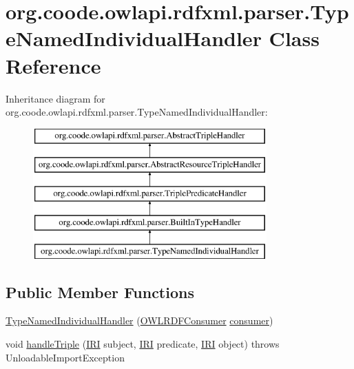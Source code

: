 \hypertarget{classorg_1_1coode_1_1owlapi_1_1rdfxml_1_1parser_1_1_type_named_individual_handler}{\section{org.\-coode.\-owlapi.\-rdfxml.\-parser.\-Type\-Named\-Individual\-Handler Class Reference}
\label{classorg_1_1coode_1_1owlapi_1_1rdfxml_1_1parser_1_1_type_named_individual_handler}
}
Inheritance diagram for org.\-coode.\-owlapi.\-rdfxml.\-parser.\-Type\-Named\-Individual\-Handler\-:\begin{figure}[H]
\begin{center}
\leavevmode
\includegraphics[height=5.000000cm]{classorg_1_1coode_1_1owlapi_1_1rdfxml_1_1parser_1_1_type_named_individual_handler}
\end{center}
\end{figure}
\subsection*{Public Member Functions}
\begin{DoxyCompactItemize}
\item 
\hyperlink{classorg_1_1coode_1_1owlapi_1_1rdfxml_1_1parser_1_1_type_named_individual_handler_af120a7cf8e2a012c6976d8f0dceeca6f}{Type\-Named\-Individual\-Handler} (\hyperlink{classorg_1_1coode_1_1owlapi_1_1rdfxml_1_1parser_1_1_o_w_l_r_d_f_consumer}{O\-W\-L\-R\-D\-F\-Consumer} \hyperlink{classorg_1_1coode_1_1owlapi_1_1rdfxml_1_1parser_1_1_abstract_triple_handler_a4ccf4d898ff01eb1cadfa04b23d54e9c}{consumer})
\item 
void \hyperlink{classorg_1_1coode_1_1owlapi_1_1rdfxml_1_1parser_1_1_type_named_individual_handler_adbf2a70c1861a3ad8108353be41944c9}{handle\-Triple} (\hyperlink{classorg_1_1semanticweb_1_1owlapi_1_1model_1_1_i_r_i}{I\-R\-I} subject, \hyperlink{classorg_1_1semanticweb_1_1owlapi_1_1model_1_1_i_r_i}{I\-R\-I} predicate, \hyperlink{classorg_1_1semanticweb_1_1owlapi_1_1model_1_1_i_r_i}{I\-R\-I} object)  throws Unloadable\-Import\-Exception 
\end{DoxyCompactItemize}

